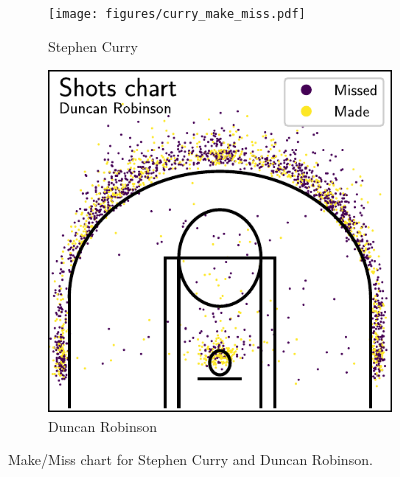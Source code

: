 \begin{figure}
    \centering
    \begin{subfigure}[b]{0.49\textwidth}
        \centering
        \texttt{[image: figures/curry\_make\_miss.pdf]}
        \caption{Stephen Curry}
        \label{fig:curry_make_miss}
    \end{subfigure}
    \hfill
    \begin{subfigure}[b]{0.49\textwidth}
        \centering
        \includegraphics[width=\textwidth]{figures/robinson_make_miss.pdf}
        \caption{Duncan Robinson}
        \label{fig:robinson_make_miss}
    \end{subfigure}
    \caption{Make/Miss chart for Stephen Curry and Duncan Robinson.}
    \label{fig:shoots_make_miss}
\end{figure}


